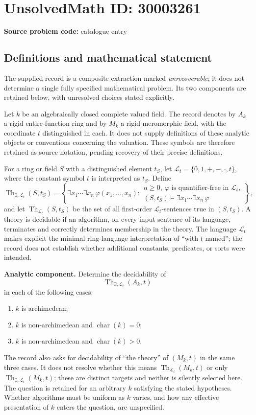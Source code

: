 \documentclass[11pt]{article}
\begin{document}
\section*{UnsolvedMath ID: 30003261}
\textbf{Source problem code:} catalogue entry
\subsection{Definitions and mathematical statement}
The supplied record is a composite extraction marked \emph{unrecoverable}; it does not determine a single fully specified mathematical problem. Its two components are retained below, with unresolved choices stated explicitly.

Let \(k\) be an algebraically closed complete valued field. The record denotes by \(A_k\) a rigid entire-function ring and by \(M_k\) a rigid meromorphic field, with the coordinate \(t\) distinguished in each. It does not supply definitions of these analytic objects or conventions concerning the valuation. These symbols are therefore retained as source notation, pending recovery of their precise definitions.

For a ring or field \(S\) with a distinguished element \(t_S\), let \(\mathcal L_t=\{0,1,+,-,\cdot,t\}\), where the constant symbol \(t\) is interpreted as \(t_S\). Define
\[
\operatorname{Th}_{\exists,\mathcal L_t}(S,t_S)
 =\left\{\exists x_1\cdots\exists x_n\,\varphi(x_1,\ldots,x_n):
 \begin{array}{l}
 n\geq 0,\ \varphi\text{ is quantifier-free in }\mathcal L_t,\\
 (S,t_S)\models\exists x_1\cdots\exists x_n\,\varphi
 \end{array}\right\},
\]
and let \(\operatorname{Th}_{\mathcal L_t}(S,t_S)\) be the set of all first-order \(\mathcal L_t\)-sentences true in \((S,t_S)\). A theory is decidable if an algorithm, on every input sentence of its language, terminates and correctly determines membership in the theory. The language \(\mathcal L_t\) makes explicit the minimal ring-language interpretation of ``with \(t\) named''; the record does not establish whether additional constants, predicates, or sorts were intended.

\textbf{Analytic component.} Determine the decidability of
\[
\operatorname{Th}_{\exists,\mathcal L_t}(A_k,t)
\]
in each of the following cases:
\begin{enumerate}
\item \(k\) is archimedean;
\item \(k\) is non-archimedean and \(\operatorname{char}(k)=0\);
\item \(k\) is non-archimedean and \(\operatorname{char}(k)>0\).
\end{enumerate}
The record also asks for decidability of ``the theory'' of \((M_k,t)\) in the same three cases. It does not resolve whether this means
\(\operatorname{Th}_{\mathcal L_t}(M_k,t)\) or only
\(\operatorname{Th}_{\exists,\mathcal L_t}(M_k,t)\); these are distinct targets and neither is silently selected here. The question is retained for an arbitrary \(k\) satisfying the stated hypotheses. Whether algorithms must be uniform as \(k\) varies, and how any effective presentation of \(k\) enters the question, are unspecified.
\end{document}
